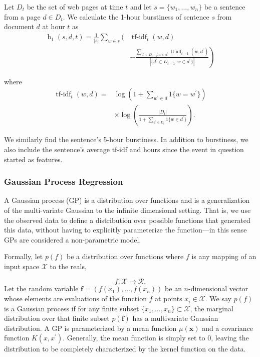 Let $D_t$ be the set of web pages at time $t$ and let $s = \{w_1,\ldots,w_n\}$ be a sentence from a page $d \in D_t$.  We calculate the 1-hour burstiness of sentence $s$ from document $d$ at hour $t$  as 
\begin{align*}
\operatorname{b}_1(s,d,t) = \frac{1}{|s|} \sum_{w \in s} \Bigg( &
\operatorname{tf-idf}_t(w,d)  \\ & \left. - \frac{\sum_{d^\prime \in D_{t-1}:
w \in d^\prime } \operatorname{tf-idf}_{t-1}(w,d^\prime)}{|\{d^\prime \in
D_{t-1}: w \in d^\prime\}|} \right) \end{align*}

where \begin{align*} \operatorname{tf-idf}_t(w,d) =&
\log\left(1+\sum_{w^\prime \in d}1\{w=w^\prime\}  \right)\\ & \times
\log\left(\frac{|D_t|}{1 + \sum_{d^\prime \in D_t}1\{w \in d^\prime\}}\right).
\end{align*}


We similarly find the sentence's 5-hour burstiness.  In addition to burstiness, we also include the sentence's average tf-idf and hours since the event in question started as features.

\subsubsection{Gaussian Process Regression}


A Gaussian process (GP) is a distribution over functions and is a 
generalization of the multi-variate Gaussian to the infinite dimensional
setting. That is, we use the observed data to define a distribution over 
possible functions that generated this data, without having to explicitly 
parameterize the function---in this sense GPs are considered 
a non-parametric model.

Formally, let $p(f)$ be a distribution over functions where $f$ is any mapping
of an input space $\mathcal{X}$ to the reals,

$$f: \mathcal{X} \rightarrow \mathcal{R}.$$ 
Let the random variable $\mathbf{f} = (f(x_1),\ldots,f(x_n) )$ be
 an $n$-dimensional vector whose elements are evaluations of the function $f$
at points $x_i \in \mathcal{X}$.
We say $p(f)$ is a Gaussian process if for any finite subset 
$\{x_1,\ldots,x_n\} \subset \mathcal{X}$, the marginal distribution over 
that finite subset $p(\mathbf{f})$ has a multivariate Gaussian distribution.
A GP is parameterized by a mean function $\mu(\mathbf{x})$ and a 
covariance function $K(x,x^\prime)$. Generally, the mean function is simply
set to 0, leaving the distribution to be completely characterized by the
kernel function on the data.

